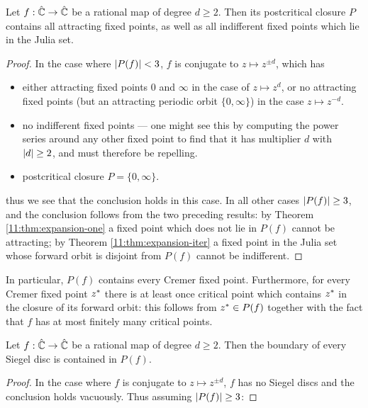 \documentclass[../main.tex]{subfiles}
\newcommand\postcrit{P}
\begin{document}
\begin{thm}
Let $f : \hat{\mathbb{C}} \to \hat{\mathbb{C}}$ be a rational map of degree $d \ge 2$. Then its postcritical closure $\postcrit$ contains all attracting fixed points, as well as all indifferent fixed points which lie in the Julia set.
\end{thm}
\begin{proof}
In the case where $\abs{\postcrit(f)} < 3$, $f$ is conjugate to $z \mapsto z^{\pm d}$, which has
\begin{itemize}
    \item either attracting fixed points $0$ and $\infty$ in the case of $z \mapsto z^d$, or no attracting fixed points (but an attracting periodic orbit $\{0, \infty\}$) in the case $z \mapsto z^{-d}$.
    \item no indifferent fixed points --- one might see this by computing the power series around any other fixed point to find that it has multiplier $d$ with $\left|d\right| \ge 2$, and must therefore be repelling.
    \item postcritical closure $P = \{0, \infty\}$.
\end{itemize}
thus we see that the conclusion holds in this case. In all other cases $\abs{\postcrit(f)} \ge 3$, and the conclusion follows from the two preceding results: by Theorem \ref{11:thm:expansion-one} a fixed point which does not lie in $\postcrit(f)$ cannot be attracting; by Theorem \ref{11:thm:expansion-iter} a fixed point in the Julia set whose forward orbit is disjoint from $\postcrit(f)$ cannot be indifferent.
\end{proof}

\begin{rmk}
In particular, $\postcrit(f)$ contains every Cremer fixed point. Furthermore, for every Cremer fixed point $z^*$ there is at least once critical point which contains $z^*$ in the closure of its forward orbit: this follows from $\fix \in \postcrit(f)$ together with the fact that $f$ has at most finitely many critical points.
\end{rmk}

\begin{thm}
Let $f : \hat{\mathbb{C}} \to \hat{\mathbb{C}}$ be a rational map of degree $d \ge 2$. Then the boundary of every Siegel disc is contained in $\postcrit(f)$.
\end{thm}
\begin{proof}
In the case where $f$ is conjugate to $z \mapsto z^{\pm d}$, $f$ has no Siegel discs and the conclusion holds vacuously. Thus assuming $\abs{\postcrit(f)} \ge 3$:
\end{proof}
\end{document}
